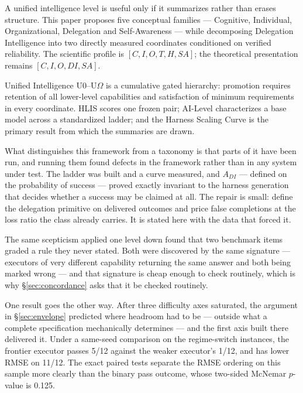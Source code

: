 \documentclass[11pt]{article}
\theoremstyle{definition}
\newcommand{\Om}{\ensuremath{\Omega}}
\begin{document}
A unified intelligence level is useful only if it summarizes rather than erases structure. This paper proposes five conceptual families --- Cognitive, Individual, Organizational, Delegation and Self-Awareness --- while decomposing Delegation Intelligence into two directly measured coordinates conditioned on verified reliability. The scientific profile is $[C, I, O, T, H, SA]$; the theoretical presentation remains $[C, I, O, DI, SA]$.

Unified Intelligence U0--U\Om{} is a cumulative gated hierarchy: promotion requires retention of all lower-level capabilities and satisfaction of minimum requirements in every coordinate. HLIS scores one frozen pair; AI-Level characterizes a base model across a standardized ladder; and the Harness Scaling Curve is the primary result from which the summaries are drawn.

What distinguishes this framework from a taxonomy is that parts of it have been run, and running them found defects in the framework rather than in any system under test. The ladder was built and a curve measured, and $A_{DI}$ --- defined on the probability of success --- proved exactly invariant to the harness generation that decides whether a success may be claimed at all. The repair is small: define the delegation primitive on delivered outcomes and price false completions at the loss ratio the class already carries. It is stated here with the data that forced it.

The same scepticism applied one level down found that two benchmark items graded a rule they never stated. Both were discovered by the same signature --- executors of very different capability returning the same answer and both being marked wrong --- and that signature is cheap enough to check routinely, which is why \S\ref{sec:concordance} asks that it be checked routinely.

One result goes the other way. After three difficulty axes saturated, the argument in \S\ref{sec:envelope} predicted where headroom had to be --- outside what a complete specification mechanically determines --- and the first axis built there delivered it. Under a same-seed comparison on the regime-switch instances, the frontier executor passes 5/12 against the weaker executor's 1/12, and has lower RMSE on 11/12. The exact paired tests separate the RMSE ordering on this sample more clearly than the binary pass outcome, whose two-sided McNemar $p$-value is 0.125.
\end{document}

